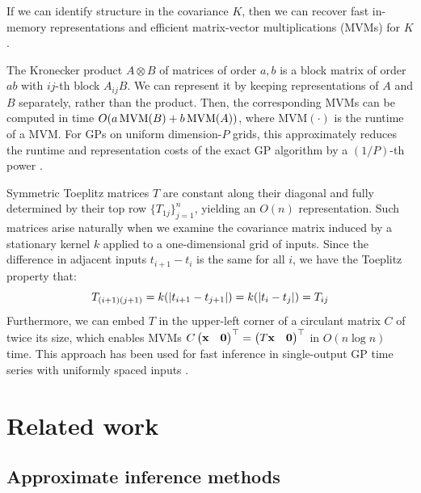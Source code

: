 \documentclass{article}
\begin{document}
If we can identify structure in the covariance $K$, then we can recover fast in-memory representations and efficient matrix-vector multiplications (MVMs) for $K$.

The Kronecker product $A\otimes B$ of matrices of order $a,b$ is a block matrix of order $ab$ with $ij$-th block $A_{ij}B$. We can represent it by keeping representations of $A$ and $B$ separately, rather than the product. Then, the corresponding MVMs can be computed in time $O(a\operatorname{MVM}(B)+b\operatorname{MVM}(A))$, where $\text{MVM}(\cdot)$ is the runtime of a MVM. For GPs on uniform dimension-$P$ grids, this approximately reduces the runtime and representation costs of the exact GP algorithm by a $(1/P)$-th power \cite{gilboa2015scaling}.

Symmetric Toeplitz matrices $T$ are constant along their diagonal and fully determined by their top row $\{T_{1j}\}_{j=1}^n$, yielding an $O(n)$ representation. Such matrices arise naturally when we examine the covariance matrix induced by a stationary kernel $k$ applied to a one-dimensional grid of inputs. Since the difference in adjacent inputs $t_{i+1}-t_{i}$ is the same for all $i$, we have the Toeplitz property that:
\[
T_{(i+1)(j+1)}=k(\left|t_{i+1} -t_{j+1}\right|)=k(\left|t_i-t_j\right|)=T_{ij}
\]
Furthermore, we can embed $T$ in the upper-left corner of a circulant matrix $C$ of twice its size, which enables MVMs $C\begin{pmatrix} \textbf{x} & \textbf{0} \end{pmatrix}^\top=\begin{pmatrix} T\textbf{x} &\textbf{0} \end{pmatrix}^\top$ in $O(n\log n)$ time. This approach has been used for fast inference in single-output GP time series with uniformly spaced inputs \cite{cunningham2008fast}.

\section{Related work}
\label{sec:related-work}
\subsection{Approximate inference methods}
\end{document}
